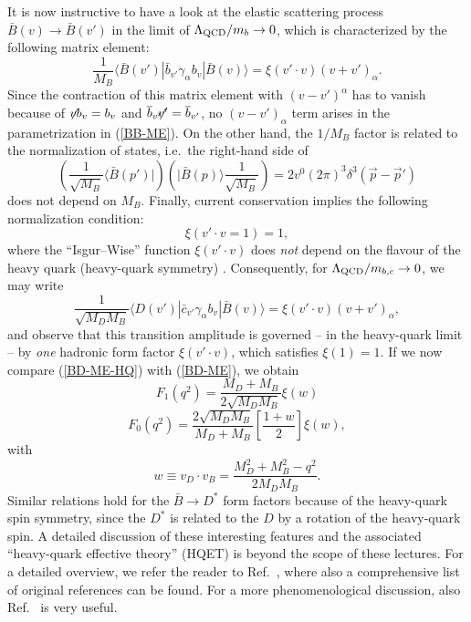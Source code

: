 \documentclass[11pt]{cernrep}
\begin{document}
It is now instructive to have a look at the elastic scattering process 
$\bar B(v)\to \bar B(v')$ in the limit of $\Lambda_{\rm QCD}/m_b \to 0$, 
which is characterized by the following matrix element:
\begin{equation}\label{BB-ME}
\frac{1}{M_B}\langle\bar B(v')|\bar b_{v'}\gamma_\alpha b_v
|\bar B(v)\rangle=\xi(v'\cdot v)(v+v')_\alpha.
\end{equation}
Since the contraction of this matrix element with $(v-v')^\alpha$ has to 
vanish because of $\not \hspace*{-0.1truecm}v b_v= b_v$ and 
$\overline{b}_{v'} \hspace*{-0.2truecm}\not \hspace*{-0.1truecm}v' = 
\overline{b}_{v'}$, no $(v-v')_\alpha$ term arises in the parametrization
in (\ref{BB-ME}). On the other hand, the $1/M_B$ factor is related
to the normalization of states, i.e.\ the right-hand side of
\begin{equation}
\left(\frac{1}{\sqrt{M_B}}\langle\bar B(p')|\right)
\left(|\bar B(p)\rangle\frac{1}{\sqrt{M_B}}\right)=2v^0(2\pi)^3
\delta^3(\vec p-\vec p')
\end{equation}
does not depend on $M_B$. Finally, current conservation implies 
the following normalization condition:
\begin{equation}
\xi(v'\cdot v=1)=1,
\end{equation}
where  the ``Isgur--Wise'' function $\xi(v'\cdot v)$ does 
{\it not} depend on the flavour of the heavy quark (heavy-quark symmetry)
\cite{IW}. Consequently, for $\Lambda_{\rm QCD}/m_{b,c}\to 0$, we may write
\begin{equation}\label{BD-ME-HQ}
\frac{1}{\sqrt{M_D M_B}}\langle D(v')|\bar c_{v'}\gamma_\alpha b_v
|\bar B(v)\rangle=\xi(v'\cdot v)(v+v')_\alpha,
\end{equation}
and observe that this transition amplitude is governed -- in the 
heavy-quark limit -- by {\it one} hadronic form factor $\xi(v'\cdot v)$, 
which satisfies $\xi(1)=1$. If we now compare (\ref{BD-ME-HQ})
with (\ref{BD-ME}), we obtain 
\begin{equation}
F_1(q^2)=\frac{M_D+M_B}{2\sqrt{M_DM_B}}\xi(w)
\end{equation}
\begin{equation}
F_0(q^2)=\frac{2\sqrt{M_DM_B}}{M_D+M_B}\left[\frac{1+w}{2}\right]\xi(w),
\end{equation}
with
\begin{equation}
w\equiv v_D\cdot v_B=\frac{M_D^2+M_B^2-q^2}{2M_DM_B}.
\end{equation}
Similar relations hold  for the $\bar B\to D^\ast$ form factors
because of the heavy-quark spin symmetry, since the $D^\ast$ is 
related to the $D$ by a rotation of the heavy-quark spin. A detailed 
discussion of these interesting features and the associated ``heavy-quark 
effective theory'' (HQET) is beyond the scope of these lectures. For
a detailed overview, we refer the reader to Ref.~\cite{neubert-rev}, where
also a comprehensive list of original references can be found. 
For a more phenomenological discussion, also Ref.~\cite{BaBar-book} is very
useful. 
\end{document}
